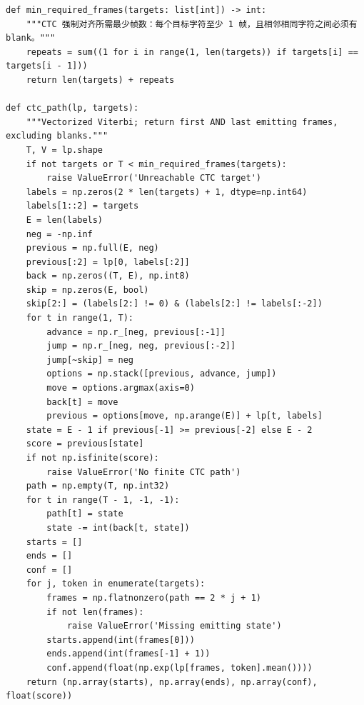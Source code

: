 \begin{lstlisting}
def min_required_frames(targets: list[int]) -> int:
    """CTC 强制对齐所需最少帧数：每个目标字符至少 1 帧，且相邻相同字符之间必须有 blank。"""
    repeats = sum((1 for i in range(1, len(targets)) if targets[i] == targets[i - 1]))
    return len(targets) + repeats

def ctc_path(lp, targets):
    """Vectorized Viterbi; return first AND last emitting frames, excluding blanks."""
    T, V = lp.shape
    if not targets or T < min_required_frames(targets):
        raise ValueError('Unreachable CTC target')
    labels = np.zeros(2 * len(targets) + 1, dtype=np.int64)
    labels[1::2] = targets
    E = len(labels)
    neg = -np.inf
    previous = np.full(E, neg)
    previous[:2] = lp[0, labels[:2]]
    back = np.zeros((T, E), np.int8)
    skip = np.zeros(E, bool)
    skip[2:] = (labels[2:] != 0) & (labels[2:] != labels[:-2])
    for t in range(1, T):
        advance = np.r_[neg, previous[:-1]]
        jump = np.r_[neg, neg, previous[:-2]]
        jump[~skip] = neg
        options = np.stack([previous, advance, jump])
        move = options.argmax(axis=0)
        back[t] = move
        previous = options[move, np.arange(E)] + lp[t, labels]
    state = E - 1 if previous[-1] >= previous[-2] else E - 2
    score = previous[state]
    if not np.isfinite(score):
        raise ValueError('No finite CTC path')
    path = np.empty(T, np.int32)
    for t in range(T - 1, -1, -1):
        path[t] = state
        state -= int(back[t, state])
    starts = []
    ends = []
    conf = []
    for j, token in enumerate(targets):
        frames = np.flatnonzero(path == 2 * j + 1)
        if not len(frames):
            raise ValueError('Missing emitting state')
        starts.append(int(frames[0]))
        ends.append(int(frames[-1] + 1))
        conf.append(float(np.exp(lp[frames, token].mean())))
    return (np.array(starts), np.array(ends), np.array(conf), float(score))
\end{lstlisting}
